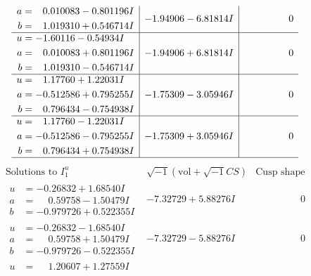 \documentclass[1p]{elsarticle_modified}
\theoremstyle{definition}
\newcommand{\I}{\sqrt{-1}}
\begin{document}
$$\begin{array}{c|c|c}
\begin{aligned}
a &= \phantom{-}0.010083 - 0.801196 I \\
b &= \phantom{-}1.019310 + 0.546714 I\end{aligned}
 & -1.94906 - 6.81814 I & \phantom{-0.000000 } 0 \\ \hline\begin{aligned}
u &= -1.60116 - 0.54934 I \\
a &= \phantom{-}0.010083 + 0.801196 I \\
b &= \phantom{-}1.019310 - 0.546714 I\end{aligned}
 & -1.94906 + 6.81814 I & \phantom{-0.000000 } 0 \\ \hline\begin{aligned}
u &= \phantom{-}1.17760 + 1.22031 I \\
a &= -0.512586 + 0.795255 I \\
b &= \phantom{-}0.796434 - 0.754938 I\end{aligned}
 & -1.75309 - 3.05946 I & \phantom{-0.000000 } 0 \\ \hline\begin{aligned}
u &= \phantom{-}1.17760 - 1.22031 I \\
a &= -0.512586 - 0.795255 I \\
b &= \phantom{-}0.796434 + 0.754938 I\end{aligned}
 & -1.75309 + 3.05946 I & \phantom{-0.000000 } 0\\
 \hline 
 \end{array}$$\newpage$$\begin{array}{c|c|c}  
\text{Solutions to }I^u_{1}& \I (\text{vol} + \sqrt{-1}CS) & \text{Cusp shape}\\
 \hline 
\begin{aligned}
u &= -0.26832 + 1.68540 I \\
a &= \phantom{-}0.59758 - 1.50479 I \\
b &= -0.979726 + 0.522355 I\end{aligned}
 & -7.32729 + 5.88276 I & \phantom{-0.000000 } 0 \\ \hline\begin{aligned}
u &= -0.26832 - 1.68540 I \\
a &= \phantom{-}0.59758 + 1.50479 I \\
b &= -0.979726 - 0.522355 I\end{aligned}
 & -7.32729 - 5.88276 I & \phantom{-0.000000 } 0 \\ \hline\begin{aligned}
u &= \phantom{-}1.20607 + 1.27559 I \\

\end{aligned}
\end{array}$$
\end{document}
